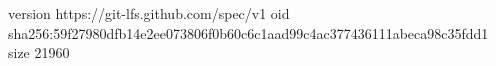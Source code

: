version https://git-lfs.github.com/spec/v1
oid sha256:59f27980dfb14e2ee073806f0b60c6c1aad99c4ac377436111abeca98c35fdd1
size 21960
